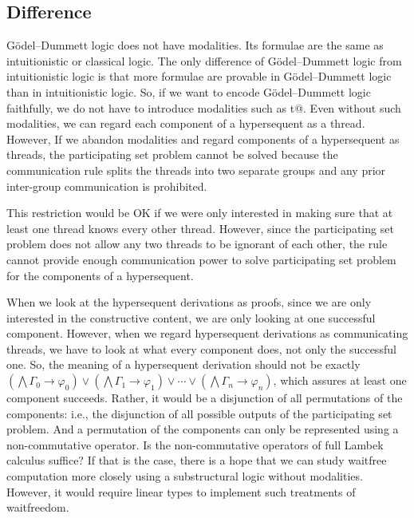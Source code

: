 \subsection{Difference}

G\"odel--Dummett logic does not have modalities.  Its formulae are the
same as intuitionistic or classical logic.  The only difference of
G\"odel--Dummett logic from intuitionistic logic is that more formulae
are provable in G\"odel--Dummett
logic than in intuitionistic logic.  So, if we want to encode G\"odel--Dummett
logic faithfully, we do not have to introduce modalities such as \verb@K t@.
Even without such modalities, we can regard each component of a
hypersequent as a thread. However,
If we abandon modalities and regard components of a hypersequent as
threads, the participating set problem cannot be solved because the communication rule
splits the threads into two separate groups and any prior
inter-group communication is prohibited.

This restriction would be OK if we were only interested in making sure that
at least one thread knows every other thread.  However, since the
participating set problem does not allow any two threads to be ignorant
of each other, the \verb@comm@ rule cannot provide enough communication power
to solve participating set problem for the components of a hypersequent.

When we look at the hypersequent derivations as proofs, since we are only
interested in the constructive content, we are only looking at one
successful component.  However, when we regard hypersequent derivations as
communicating threads, we have to look at what every component does, not
only the successful one.  So, the meaning of a hypersequent derivation
should not be exactly
$\left(\bigwedge\Gamma_0\rightarrow\varphi_0\right)\vee\left(\bigwedge\Gamma_1\rightarrow\varphi_1\right)\vee\cdots\vee\left(\bigwedge
\Gamma_n\rightarrow\varphi_n\right)$, which assures at least one component
succeeds.
Rather, it would be a disjunction of all permutations of the components:
i.e., the disjunction of all possible outputs of the participating set problem.
And a permutation of the components can only be represented using a
non-commutative operator.  Is the non-commutative operators of
full Lambek calculus suffice?  If that is the case, there is a hope that
we can study
waitfree computation more closely using a substructural logic without
modalities.
However, it would require linear types to implement such treatments of
waitfreedom.

